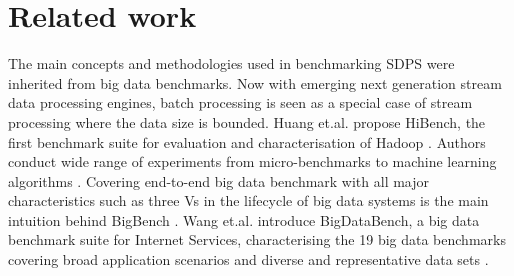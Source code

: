 \section{Related work}
The main concepts and methodologies used in benchmarking SDPS were inherited from big data benchmarks.
Now with emerging next generation stream data processing engines, batch processing is seen as a special case of stream processing where the data size is bounded. Huang et.al. propose HiBench, the first benchmark suite for evaluation and characterisation of Hadoop \cite{white2012hadoop}. Authors conduct wide range of experiments from micro-benchmarks to machine learning algorithms \cite{huang2011hibench}. Covering end-to-end big data benchmark with all major characteristics such as three Vs in the lifecycle of big data systems is the main intuition behind BigBench \cite{ghazal2013bigbench}. Wang et.al. introduce BigDataBench, a big data benchmark suite for Internet Services, characterising the 19 big data benchmarks covering broad application scenarios and diverse and representative data sets \cite{wang2014bigdatabench}.

